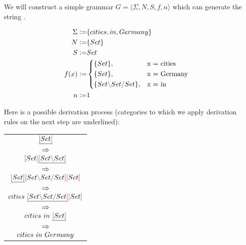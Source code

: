 \documentclass[main.tex]{subfiles}
\begin{document}
\begin{example}
    \label{ex:deriv}

    We will construct a simple grammar $G = \langle \Sigma, N, S, f, n \rangle$
    which can generate the string .

    \begin{align*}
        \Sigma \defeq& \{ cities, in, Germany \} \\
        N \defeq& \{ Set \} \\
        S \defeq& Set \\
        f(x) \defeq&
            \begin{cases*}
                \{ Set \},& x = cities \\
                \{ Set \},& x = Germany \\
                \{ Set \lc Set \rc Set \},& x = in \\
            \end{cases*} \\
        n \defeq& 1 \\
    \end{align*}

    Here is a possible derivation process (categories to which we apply
    derivation rules on the next step are underlined):
    \begin{center}
        \begin{tabular}{c}
            $\underline{\textcolor{red}{[} Set \textcolor{red}{]}}$ \\ $\Rightarrow$ \\
            $\textcolor{red}{[} Set \textcolor{red}{]} \underline{\textcolor{red}{[} Set \textcolor{red}{\backslash} Set \textcolor{red}{]}}$ \\ $\Rightarrow$ \\
            $\underline{\textcolor{red}{[} Set \textcolor{red}{]}} \textcolor{red}{[} Set \textcolor{red}{\backslash} Set \textcolor{red}{/} Set \textcolor{red}{]} \textcolor{red}{[} Set \textcolor{red}{]}$ \\ $\Rightarrow$ \\
            $cities \text{ } \underline{\textcolor{red}{[} Set \textcolor{red}{\backslash} Set \textcolor{red}{/} Set \textcolor{red}{]}} \textcolor{red}{[} Set \textcolor{red}{]}$ \\ $\Rightarrow$ \\
            $cities \text{ } in \text{ } \underline{\textcolor{red}{[} Set \textcolor{red}{]}}$ \\ $\Rightarrow$ \\
            $cities \text{ } in \text{ } Germany$ \\
        \end{tabular}
    \end{center}
\end{example}
\end{document}
